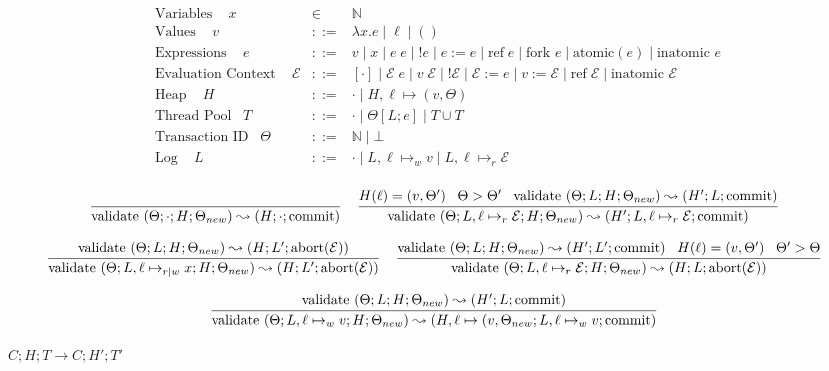 \documentclass[9pt]{article}
\newcommand{\ctxt}[0]{\mathcal{E}}
\newcommand{\loc}[0]{\ell}
\newcommand{\atomic}[1]{\text{atomic}(#1)}
\newcommand{\alloc}[1]{\text{ref} \; #1}
\newcommand{\commit}[0]{\text{commit}}
\newcommand{\abort}[1]{\text{abort}(#1)}
\newcommand{\fork}[1]{\text{fork } #1}
\newcommand{\inatomic}[1]{\text{inatomic } #1}
\newcommand{\validate}[1]{\text{validate }(#1)}
\begin{document}
\begingroup\makeatletter{}\check@mathfonts


\begin{displaymath}
\begin{array}{rcll}
\text{Variables } \;\;\; x &\in& \mathbb{N} \\
\text{Values } \;\;\; v &::=& \lambda x. e \; | \; \loc \; | \; () \\
\text{Expressions } \;\;\; e &::=& v \; | \; x \; | \; e \; e \; | \; !e \; | \; e := e \; | \; \alloc{e} \; | \; \fork{e} \; | \; \atomic{e} \; | \; \inatomic{e}\\
\text{Evaluation Context } \;\;\; \ctxt &::=& [\cdot] \; | \; \ctxt \; e \; | \; v \; \ctxt \; | \; ! \ctxt \; | \; \ctxt := e \; | \; v := \ctxt \; | \; \alloc{\ctxt} \; | \; \inatomic{\ctxt}\\
\text{Heap } \;\;\; H &::=& \cdot \; | \; H, \loc \mapsto (v, \Theta) \\
\text{Thread Pool} \;\;\; T &::=& \cdot \; | \; \Theta[L; e] \; | \; T \cup T \\
\text{Transaction ID} \;\;\; \Theta &::=& \mathbb{N} \; | \; \bot \\
\text{Log } \;\;\; L &::=& \cdot \; | \; L, \loc \mapsto_w v \; | \; L, \loc \mapsto_r \ctxt \\
\end{array}
\end{displaymath}

\[
\infer[]{\validate{\Theta; \cdot; H; \Theta_{new}} \leadsto (H; \cdot; \commit)}{} \;\;\;
\infer[]{\validate{\Theta; L, \loc \mapsto_r \ctxt; H; \Theta_{new}} \leadsto (H'; L, \loc \mapsto_r \ctxt; \commit)}{H(\loc) = (v, \Theta') \;\;\; \Theta > \Theta' \;\;\; \validate{\Theta; L; H; \Theta_{new}} \leadsto (H'; L; \commit)}
\]

\[
\infer[]{\validate{\Theta; L, \loc \mapsto_{r|w} x; H; \Theta_{new}} \leadsto (H; L'; \abort{\ctxt})}{\validate{\Theta; L; H; \Theta_{new}} \leadsto (H; L'; \abort{\ctxt})} \;\;\;
\infer[]{\validate{\Theta; L, \loc \mapsto_r \ctxt; H; \Theta_{new}} \leadsto (H; L; \abort{\ctxt})}{\validate{\Theta; L; H; \Theta_{new}} \leadsto (H'; L'; \commit) \;\;\; H(\loc) = (v, \Theta') \;\;\; \Theta' > \Theta}
\]

\[
\infer[]{\validate{\Theta; L, \loc \mapsto_w v; H; \Theta_{new}} \leadsto (H, \loc \mapsto (v, \Theta_{new}; L, \loc \mapsto_w v; \commit)}{\validate{\Theta; L; H; \Theta_{new}} \leadsto (H'; L; \commit)}
\]

$\boxed{C; H; T \rightarrow C; H' ;T'}$
\end{document}
